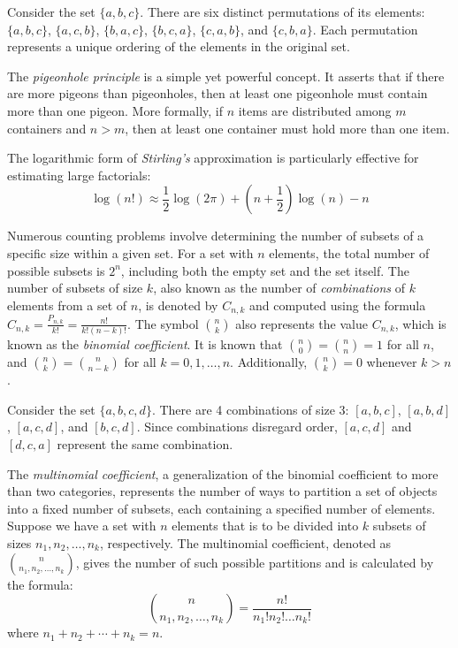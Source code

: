 \begin{example}
Consider the set $\{a, b, c\}$. There are six distinct permutations of its elements: $\{a, b, c\}$, $\{a, c, b\}$, $\{b, a, c\}$, $\{b, c, a\}$, $\{c, a, b\}$, and $\{c, b, a\}$. Each permutation represents a unique ordering of the elements in the original set.
\end{example}

The \emph{pigeonhole principle} is a simple yet powerful concept. It asserts that if there are more pigeons than pigeonholes, then at least one pigeonhole must contain more than one pigeon. More formally, if $n$ items are distributed among $m$ containers and $n > m$, then at least one container must hold more than one item.

The logarithmic form of \emph{Stirling's} approximation is particularly effective for estimating large factorials:
\[
\log\left(n!\right) \approx \frac{1}{2}\log\left(2\pi\right)+\left(n+\frac{1}{2}\right)\log\left(n\right)-n
\]

Numerous counting problems involve determining the number of subsets of a specific size within a given set. For a set with $n$ elements, the total number of possible subsets is $2^n$, including both the empty set and the set itself. The number of subsets of size $k$, also known as the number of \emph{combinations} of $k$ elements from a set of $n$, is denoted by $C_{n,k}$ and computed using the formula $C_{n,k} = \frac{P_{n,k}}{k!} = \frac{n!}{k!(n-k)!}
$. The symbol ${n \choose k}$ also represents the value $C_{n,k}$, which is known as the \emph{binomial coefficient}. It is known that ${n \choose 0} = {n \choose n} = 1$ for all $n$, and ${n \choose k} = {n \choose n-k}$ for all $k = 0, 1, \ldots, n$. Additionally, ${n \choose k} = 0$ whenever $k > n$.

\begin{example}
Consider the set $\{a, b, c, d\}$. There are 4 combinations of size 3: $[a, b, c]$, $[a, b, d]$, $[a, c, d]$, and $[b, c, d]$. Since combinations disregard order, $[a, c, d]$ and $[d, c, a]$ represent the same combination.
\end{example}

The \emph{multinomial coefficient}, a generalization of the binomial coefficient to more than two categories, represents the number of ways to partition a set of objects into a fixed number of subsets, each containing a specified number of elements. Suppose we have a set with $n$ elements that is to be divided into $k$ subsets of sizes $n_1, n_2, \ldots, n_k$, respectively. The multinomial coefficient, denoted as ${n \choose n_{1}, n_{2},\ldots, n_{k}}$, gives the number of such possible partitions and is calculated by the formula:
\[
{n \choose n_{1},n_{2},\ldots,n_{k}} = \frac{n!}{n_{1}!n_{2}!\ldots n_{k}!}
\]
where $n_1 + n_2 + \cdots + n_k = n$.

